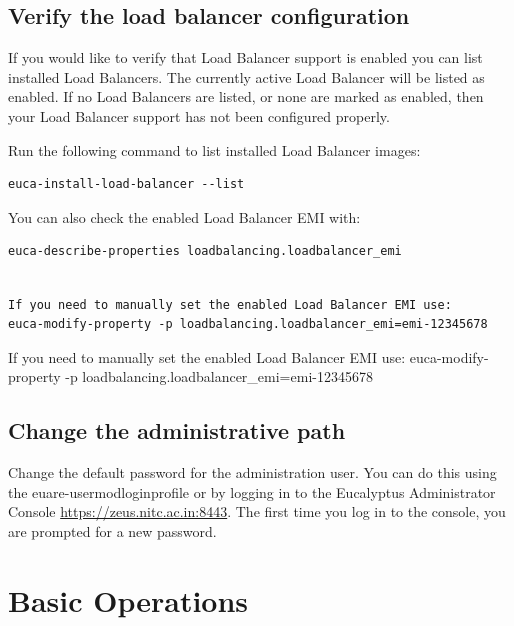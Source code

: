 \section{Verify the load balancer configuration}

If you would like to verify that Load Balancer support is enabled you can list installed Load Balancers. The currently active Load Balancer will be listed as enabled. If no Load Balancers are listed, or none are marked as enabled, then your Load Balancer support has not been configured properly.

Run the following command to list installed Load Balancer images:
\begin{lstlisting}
euca-install-load-balancer --list
\end{lstlisting}
You can also check the enabled Load Balancer EMI with:
\begin{lstlisting}
euca-describe-properties loadbalancing.loadbalancer_emi
\end{lstlisting}
\begin{lstlisting}

If you need to manually set the enabled Load Balancer EMI use:
euca-modify-property -p loadbalancing.loadbalancer_emi=emi-12345678
\end{lstlisting}
If you need to manually set the enabled Load Balancer EMI use:
euca-modify-property -p loadbalancing.loadbalancer_emi=emi-12345678

\section{Change the administrative path}
Change the default password for the administration user. You can do this using the euare-usermodloginprofile or by logging in to the Eucalyptus Administrator Console \url{https://zeus.nitc.ac.in:8443}. The first time you log in to the console, you are prompted for a new password.
\chapter{Basic Operations}
